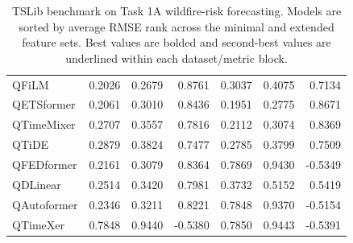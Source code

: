 \begin{table}[t]
\begin{tabular}{lrrrrrr}
QFiLM & 0.2026 & 0.2679 & 0.8761 & 0.3037 & 0.4075 & 0.7134 \\
QETSformer & 0.2061 & 0.3010 & 0.8436 & 0.1951 & 0.2775 & 0.8671 \\
QTimeMixer & 0.2707 & 0.3557 & 0.7816 & 0.2112 & 0.3074 & 0.8369 \\
QTiDE & 0.2879 & 0.3824 & 0.7477 & 0.2785 & 0.3799 & 0.7509 \\
QFEDformer & 0.2161 & 0.3079 & 0.8364 & 0.7869 & 0.9430 & -0.5349 \\
QDLinear & 0.2514 & 0.3420 & 0.7981 & 0.3732 & 0.5152 & 0.5419 \\
QAutoformer & 0.2346 & 0.3211 & 0.8221 & 0.7848 & 0.9370 & -0.5154 \\
QTimeXer & 0.7848 & 0.9440 & -0.5380 & 0.7850 & 0.9443 & -0.5391 \\
\bottomrule
\end{tabular}
\caption{TSLib benchmark on Task 1A wildfire-risk forecasting. Models are sorted by average RMSE rank across the minimal and extended feature sets. Best values are bolded and second-best values are underlined within each dataset/metric block.}
\label{tab:task1a-tslib-benchmarks}
\end{table}
